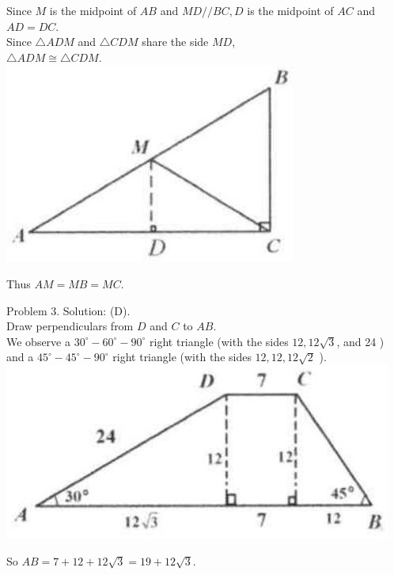 \documentclass[10pt]{article}
\begin{document}
Since \(M\) is the midpoint of \(A B\) and \(M D / / B C, D\) is the midpoint of \(A C\) and \(A D=D C\).\\
Since \(\triangle A D M\) and \(\triangle C D M\) share the side \(M D\),\\
\(\triangle A D M \cong \triangle C D M\).\\
\includegraphics[max width=\textwidth, center]{2025_04_17_97bc1f7e44d93c271a88g-092(1)}

Thus \(A M=M B=M C\).

Problem 3. Solution: (D).\\
Draw perpendiculars from \(D\) and \(C\) to \(A B\).\\
We observe a \(30^{\circ}-60^{\circ}-90^{\circ}\) right triangle (with the sides \(12,12 \sqrt{3}\), and 24 ) and a \(45^{\circ}-45^{\circ}-90^{\circ}\) right triangle (with the sides \(12,12,12 \sqrt{2}\) ).\\
\includegraphics[max width=\textwidth, center]{2025_04_17_97bc1f7e44d93c271a88g-092(2)}

So \(A B=7+12+12 \sqrt{3}=19+12 \sqrt{3}\).
\end{document}
